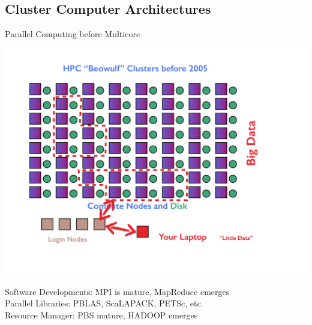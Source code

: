 \subsection{Cluster Computer Architectures}
\makesubcontentsslidessec

\begin{frame}{Parallel Computing before Multicore}
\begin{minipage}{8.0cm}
  \includegraphics[trim=3cm 0cm 0cm 0cm,clip=true,height=0.9\textheight]
  {../common/pics/hardware/ParallelHardware22.pdf}\hfill
\end{minipage}
\hspace{1ex}
\begin{minipage}{3.6cm}\small
  \begin{block}{Software Developments:}\pause
    \scriptsize MPI is mature, MapReduce emerges \\[1ex]
    Parallel Libraries: PBLAS, ScaLAPACK, PETSc, etc. \\[1ex]
    Resource Manager: PBS mature, HADOOP emerges
  \end{block}
\end{minipage}
\end{frame}

